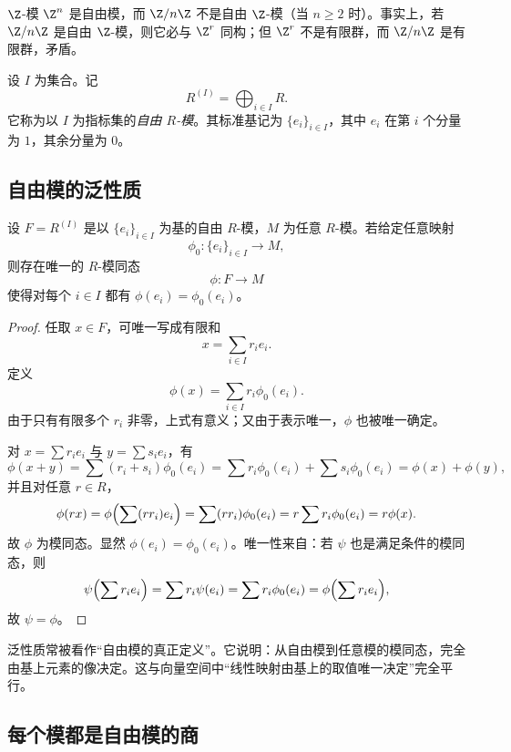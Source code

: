 \begin{example}
$\Z$-模 $\Z^n$ 是自由模，而 $\Z/n\Z$ 不是自由 $\Z$-模（当 $n\ge 2$ 时）。事实上，若 $\Z/n\Z$ 是自由 $\Z$-模，则它必与 $\Z^r$ 同构；但 $\Z^r$ 不是有限群，而 $\Z/n\Z$ 是有限群，矛盾。
\end{example}

\begin{definition}
设 $I$ 为集合。记
\[
R^{(I)}=\bigoplus_{i\in I} R.
\]
它称为以 $I$ 为指标集的\emph{自由 $R$-模}。其标准基记为 $\{e_i\}_{i\in I}$，其中 $e_i$ 在第 $i$ 个分量为 $1$，其余分量为 $0$。
\end{definition}

\subsection{自由模的泛性质}

\begin{proposition}[自由模的泛性质]
设 $F=R^{(I)}$ 是以 $\{e_i\}_{i\in I}$ 为基的自由 $R$-模，$M$ 为任意 $R$-模。若给定任意映射
\[
\phi_0\colon \{e_i\}_{i\in I}\to M,
\]
则存在唯一的 $R$-模同态
\[
\phi\colon F\to M
\]
使得对每个 $i\in I$ 都有 $\phi(e_i)=\phi_0(e_i)$。
\end{proposition}

\begin{proof}
任取 $x\in F$，可唯一写成有限和
\[
x=\sum_{i\in I} r_ie_i.
\]
定义
\[
\phi(x)=\sum_{i\in I} r_i\phi_0(e_i).
\]
由于只有有限多个 $r_i$ 非零，上式有意义；又由于表示唯一，$\phi$ 也被唯一确定。

对 $x=\sum r_ie_i$ 与 $y=\sum s_ie_i$，有
\[
\phi(x+y)=\sum (r_i+s_i)\phi_0(e_i)=\sum r_i\phi_0(e_i)+\sum s_i\phi_0(e_i)=\phi(x)+\phi(y),
\]
并且对任意 $r\in R$，
\[
\phi(rx)=\phi\Bigl(\sum (rr_i)e_i\Bigr)=\sum (rr_i)\phi_0(e_i)=r\sum r_i\phi_0(e_i)=r\phi(x).
\]
故 $\phi$ 为模同态。显然 $\phi(e_i)=\phi_0(e_i)$。唯一性来自：若 $\psi$ 也是满足条件的模同态，则
\[
\psi\Bigl(\sum r_ie_i\Bigr)=\sum r_i\psi(e_i)=\sum r_i\phi_0(e_i)=\phi\Bigl(\sum r_ie_i\Bigr),
\]
故 $\psi=\phi$。
\end{proof}

\begin{remark}
泛性质常被看作“自由模的真正定义”。它说明：从自由模到任意模的模同态，完全由基上元素的像决定。这与向量空间中“线性映射由基上的取值唯一决定”完全平行。
\end{remark}

\subsection{每个模都是自由模的商}

